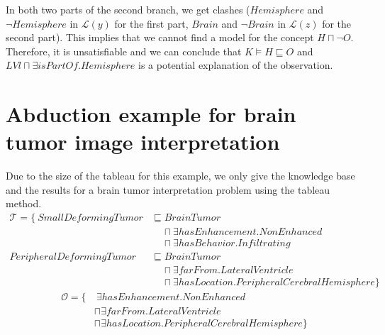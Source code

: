 \documentclass{article}
\begin{document}
\begin{center}
\end{center}

In both two parts of the second branch, we get clashes ($Hemisphere$ and $\neg Hemisphere$ in $\mathcal{L}(y)$ for the first part, $Brain$ and $\neg Brain$ in $\mathcal{L}(z)$ for the second part).
This implies that we cannot find a model for the concept $H\sqcap \neg O$. Therefore, it is unsatisfiable and we can conclude that $K\vDash H\sqsubseteq O$ and $LVl\sqcap \exists isPartOf.Hemisphere$ is a potential
explanation of the observation.

\section{Abduction example for brain tumor image interpretation}
Due to the size of the tableau for this example, we only give the knowledge base and the results for a brain tumor interpretation problem using the tableau method.
\begin{align*}
\mathcal{T}=\{~SmallDeformingTumor &\sqsubseteq BrainTumor\\
 &~~~~~\sqcap \exists hasEnhancement. NonEnhanced \\
&~~~~~\sqcap \exists hasBehavior. Infiltrating  \\
PeripheralDeformingTumor &\sqsubseteq BrainTumor\\
&~~~~~ \sqcap \exists farFrom. LateralVentricle \\
&~~~~~ \sqcap \exists hasLocation. PeripheralCerebralHemisphere \} 
\end{align*}\vspace{-0.9cm}
\begin{align*}
\mathcal{O} =\{&~\exists hasEnhancement. NonEnhanced \\
 &\sqcap \exists farFrom. LateralVentricle \\
&\sqcap \exists hasLocation. PeripheralCerebralHemisphere \} 
\end{align*}
\end{document}
